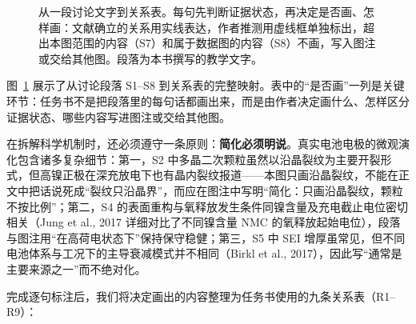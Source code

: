 \begin{figure}[htbp]\centering

\caption{从一段讨论文字到关系表。每句先判断证据状态，再决定是否画、怎样画：文献确立的关系用实线表达，作者推测用虚线框单独标出，超出本图范围的内容（S7）和属于数据图的内容（S8）不画，写入图注或交给其他图。段落为本书撰写的教学文字。}\label{fig:ch02-03}
\end{figure}

图~\ref{fig:ch02-03} 展示了从讨论段落 S1–S8 到关系表的完整映射。表中的“是否画”一列是关键环节：任务书不是把段落里的每句话都画出来，而是由作者决定画什么、怎样区分证据状态、哪些内容写进图注或交给其他图。

在拆解科学机制时，还必须遵守一条原则：\textbf{简化必须明说}。真实电池电极的微观演化包含诸多复杂细节：第一，S2 中多晶二次颗粒虽然以沿晶裂纹为主要开裂形式，但高镍正极在深充放电下也有晶内裂纹报道——本图只画沿晶裂纹，不能在正文中把话说死成“裂纹只沿晶界”，而应在图注中写明“简化：只画沿晶裂纹，颗粒不按比例”；第二，S4 的表面重构与氧释放发生条件同镍含量及充电截止电位密切相关（Jung et al., 2017 详细对比了不同镍含量 NMC 的氧释放起始电位），段落与图注用“在高荷电状态下”保持保守稳健；第三，S5 中 SEI 增厚虽常见，但不同电池体系与工况下的主导衰减模式并不相同（Birkl et al., 2017），因此写“通常是主要来源之一”而不绝对化。

完成逐句标注后，我们将决定画出的内容整理为任务书使用的九条关系表（R1–R9）：

